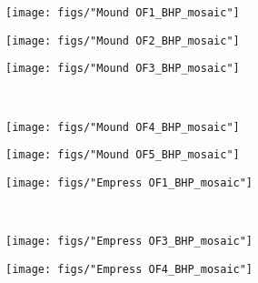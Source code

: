 \begin{figure}[h]\ContinuedFloat
    \begin{subfigure}[b]{\linewidth}
    	\texttt{[image: figs/"Mound OF1\_BHP\_mosaic"]}
        \label{fig:MS1_degform}
    \end{subfigure}
    \begin{subfigure}[b]{\linewidth}
        \texttt{[image: figs/"Mound OF2\_BHP\_mosaic"]}
        \label{fig:MS2_degform}
    \end{subfigure}
\end{figure}

\newpage

\begin{figure}[h]\ContinuedFloat
    \begin{subfigure}[b]{\linewidth}
        \texttt{[image: figs/"Mound OF3\_BHP\_mosaic"]}
        \label{fig:MS3_degform}
    \end{subfigure}\\[-4ex]
    \begin{subfigure}[b]{\linewidth}
    	\texttt{[image: figs/"Mound OF4\_BHP\_mosaic"]}
        \label{fig:MS4_degform}
    \end{subfigure}
\end{figure}

\newpage

\begin{figure}[h]\ContinuedFloat
    \begin{subfigure}[b]{\linewidth}
        \texttt{[image: figs/"Mound OF5\_BHP\_mosaic"]}
        \label{fig:MS5_degform}
    \end{subfigure}
    \begin{subfigure}[b]{\linewidth}
        \texttt{[image: figs/"Empress OF1\_BHP\_mosaic"]}
        \label{fig:EP1_degform}
    \end{subfigure}\\[-4ex]
\end{figure}

\newpage

\begin{figure}[h]\ContinuedFloat
    \begin{subfigure}[b]{\linewidth}
        \texttt{[image: figs/"Empress OF3\_BHP\_mosaic"]}
        \label{fig:EP3_degform}
    \end{subfigure}
    \begin{subfigure}[b]{\linewidth}
        \texttt{[image: figs/"Empress OF4\_BHP\_mosaic"]}
        \label{fig:EP4_degform}
    \end{subfigure}
\end{figure}

